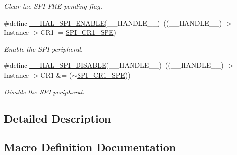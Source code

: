 \begin{DoxyCompactItemize}
\begin{DoxyCompactList}\small\item\em Clear the S\+PI F\+RE pending flag. \end{DoxyCompactList}\item 
\#define \hyperlink{group___s_p_i___exported___macros_ga16d2d73c2b16004499ae8d492e71fd4e}{\+\_\+\+\_\+\+H\+A\+L\+\_\+\+S\+P\+I\+\_\+\+E\+N\+A\+B\+LE}(\+\_\+\+\_\+\+H\+A\+N\+D\+L\+E\+\_\+\+\_\+)~((\+\_\+\+\_\+\+H\+A\+N\+D\+L\+E\+\_\+\+\_\+)-\/$>$Instance-\/$>$C\+R1 $\vert$=  \hyperlink{group___peripheral___registers___bits___definition_gac5a646d978d3b98eb7c6a5d95d75c3f9}{S\+P\+I\+\_\+\+C\+R1\+\_\+\+S\+PE})
\begin{DoxyCompactList}\small\item\em Enable the S\+PI peripheral. \end{DoxyCompactList}\item 
\#define \hyperlink{group___s_p_i___exported___macros_gaa10d88f87d16de53bd81dfb33bd56959}{\+\_\+\+\_\+\+H\+A\+L\+\_\+\+S\+P\+I\+\_\+\+D\+I\+S\+A\+B\+LE}(\+\_\+\+\_\+\+H\+A\+N\+D\+L\+E\+\_\+\+\_\+)~((\+\_\+\+\_\+\+H\+A\+N\+D\+L\+E\+\_\+\+\_\+)-\/$>$Instance-\/$>$C\+R1 \&= ($\sim$\hyperlink{group___peripheral___registers___bits___definition_gac5a646d978d3b98eb7c6a5d95d75c3f9}{S\+P\+I\+\_\+\+C\+R1\+\_\+\+S\+PE}))
\begin{DoxyCompactList}\small\item\em Disable the S\+PI peripheral. \end{DoxyCompactList}\end{DoxyCompactItemize}


\subsection{Detailed Description}


\subsection{Macro Definition Documentation}
\mbox{\label{group___s_p_i___exported___macros_gad1cb4100b67726531ad426d300f4cd26}} 
